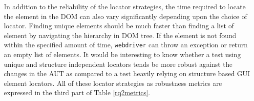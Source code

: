 In addition to the reliability of the locator strategies, the time required to locate the element in the DOM can also vary significantly depending upon the choice of locator. Finding unique elements should be much faster than finding a list of element by navigating the hierarchy in DOM tree. If the element is not found within the specified amount of time, \texttt{webdriver} can throw an exception or return an empty list of elements. It would be interesting to know whether a test using unique and structure independent locators tends be more robust against the changes in the AUT as compared to a test heavily relying on structure based GUI element locators. All of these locator strategies as robustness metrics are expressed in the third part of Table \ref{rq2metrics}.  











